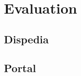 
\chapter{Evaluation}
\label{cha:evaluation}

\section{Dispedia}
\label{sec:dispedia}

\section{Portal}
\label{sec:portal}


